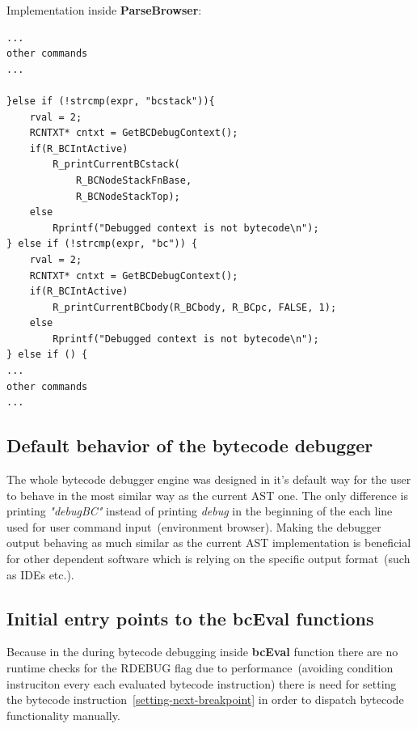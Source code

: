 \documentclass[thesis=M,english]{FITthesis}[2018/10/20]
\begin{document}
Implementation inside \textbf{ParseBrowser}:
\begin{lstlisting}
...
other commands
...

}else if (!strcmp(expr, "bcstack")){
    rval = 2;
    RCNTXT* cntxt = GetBCDebugContext();
    if(R_BCIntActive)
        R_printCurrentBCstack(
            R_BCNodeStackFnBase, 
            R_BCNodeStackTop);
    else
        Rprintf("Debugged context is not bytecode\n");
} else if (!strcmp(expr, "bc")) {
    rval = 2;
    RCNTXT* cntxt = GetBCDebugContext();
    if(R_BCIntActive)
        R_printCurrentBCbody(R_BCbody, R_BCpc, FALSE, 1);
    else
        Rprintf("Debugged context is not bytecode\n");
} else if () {
...
other commands
...
\end{lstlisting}




\subsection{Default behavior of the bytecode debugger}

The whole bytecode debugger engine was designed in it's default way for the user to behave in the most similar way as the current AST one. The only difference is printing \textit{"debugBC"} instead of printing \textit{debug} in the beginning of the each line used for user command input~(environment browser). Making the debugger output behaving as much similar as the current AST implementation is beneficial for other dependent software which is relying on the specific output format~(such as IDEs etc.).

\subsection{Initial entry points to the bcEval functions}

Because in the during bytecode debugging inside \textbf{bcEval} function there are no runtime checks for the RDEBUG flag due to performance~(avoiding condition instruciton every each evaluated bytecode instruction) there is need for setting the bytecode instruction~\ref{setting-next-breakpoint} in order to dispatch bytecode functionality manually.
\end{document}
